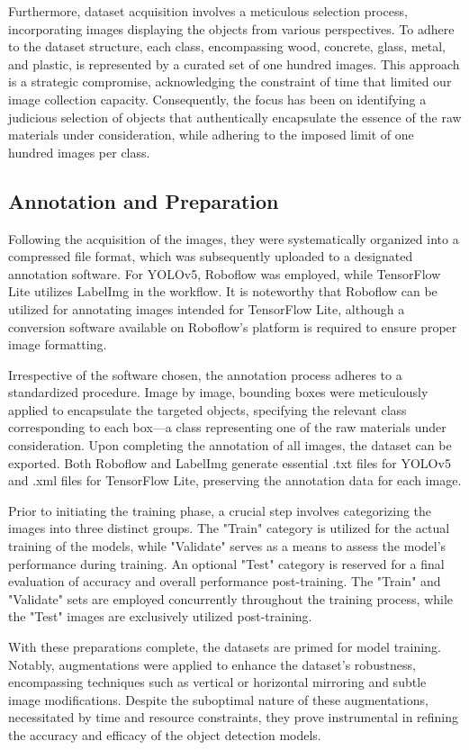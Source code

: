 \documentclass[conference]{IEEEtran}
\begin{document}
Furthermore, dataset acquisition involves a meticulous selection process, incorporating images displaying the objects from various perspectives. To adhere to the dataset structure, each class, encompassing wood, concrete, glass, metal, and plastic, is represented by a curated set of one hundred images. This approach is a strategic compromise, acknowledging the constraint of time that limited our image collection capacity. Consequently, the focus has been on identifying a judicious selection of objects that authentically encapsulate the essence of the raw materials under consideration, while adhering to the imposed limit of one hundred images per class.
\subsection{Annotation and Preparation}
Following the acquisition of the images, they were systematically organized into a compressed file format, which was subsequently uploaded to a designated annotation software. For YOLOv5, Roboflow was employed, while TensorFlow Lite utilizes LabelImg in the workflow. It is noteworthy that Roboflow can be utilized for annotating images intended for TensorFlow Lite, although a conversion software available on Roboflow's platform is required to ensure proper image formatting.

Irrespective of the software chosen, the annotation process adheres to a standardized procedure. Image by image, bounding boxes were meticulously applied to encapsulate the targeted objects, specifying the relevant class corresponding to each box—a class representing one of the raw materials under consideration. Upon completing the annotation of all images, the dataset can be exported. Both Roboflow and LabelImg generate essential .txt files for YOLOv5 and .xml files for TensorFlow Lite, preserving the annotation data for each image.

Prior to initiating the training phase, a crucial step involves categorizing the images into three distinct groups. The "Train" category is utilized for the actual training of the models, while "Validate" serves as a means to assess the model's performance during training. An optional "Test" category is reserved for a final evaluation of accuracy and overall performance post-training. The "Train" and "Validate" sets are employed concurrently throughout the training process, while the "Test" images are exclusively utilized post-training.

With these preparations complete, the datasets are primed for model training. Notably, augmentations were applied to enhance the dataset's robustness, encompassing techniques such as vertical or horizontal mirroring and subtle image modifications. Despite the suboptimal nature of these augmentations, necessitated by time and resource constraints, they prove instrumental in refining the accuracy and efficacy of the object detection models.
\end{document}
